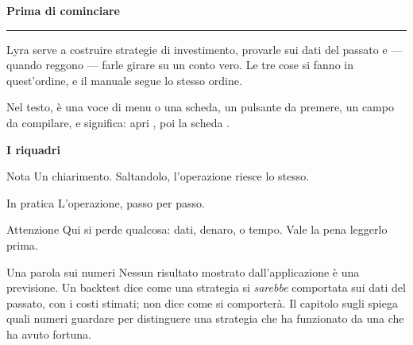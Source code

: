 \cleardoublepage

\thispagestyle{empty}
\vspace*{18mm}

{\sffamily\Large\bfseries\color{lyraInchiostro}Prima di cominciare\par}
\vspace{3mm}
{\color{lyraAccento}\rule{\textwidth}{1pt}\par}
\vspace{7mm}

\noindent
Lyra serve a costruire strategie di investimento, provarle sui dati del
passato e — quando reggono — farle girare su un conto vero. Le tre cose si
fanno in quest'ordine, e il manuale segue lo stesso ordine.

\vspace{4mm}
\noindent
Nel testo,  è una voce di menu o una scheda,  un
pulsante da premere,  un campo da compilare, e
 significa: apri , poi la
scheda .

\vspace{6mm}
{\sffamily\large\bfseries\color{lyraInchiostro}I riquadri\par}
\vspace{3mm}

\begin{nota}{Nota}
Un chiarimento. Saltandolo, l'operazione riesce lo stesso.
\end{nota}

\begin{pratica}{In pratica}
L'operazione, passo per passo.
\end{pratica}

\begin{attenzione}{Attenzione}
Qui si perde qualcosa: dati, denaro, o tempo. Vale la pena leggerlo prima.
\end{attenzione}

\vspace{6mm}
\begin{perche}{Una parola sui numeri}
Nessun risultato mostrato dall'applicazione è una previsione. Un backtest dice
come una strategia si \emph{sarebbe} comportata sui dati del passato, con i
costi stimati; non dice come si comporterà. Il capitolo sugli 
spiega quali numeri guardare per distinguere una strategia che ha funzionato
da una che ha avuto fortuna.
\end{perche}

\cleardoublepage

